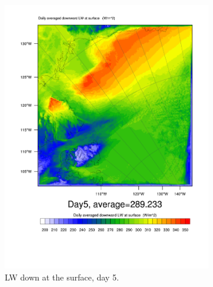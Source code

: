\begin{figure}
	\begin{subfigure}{0.48\textwidth}
		\centering
		\includegraphics[width=\textwidth]{results/control/GLW_Day5.pdf}
		\caption{LW down at the surface, day 5.}
		\label{subfig:glw_r1Day5}
	\end{subfigure}
	\quad
	\begin{subfigure}{0.48\textwidth}
		\centering

\end{subfigure}
\end{figure}
